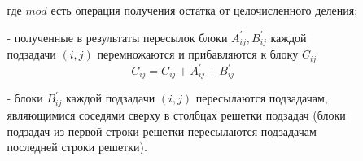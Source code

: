 \documentclass{report}
\begin{document}
\begin{enumerate}
\begin{itemize}
\begin{itemize}
$$                $$
                где {\itshape $mod$} есть операция получения остатка от целочисленного деления;
                \item[-] полученные в результаты пересылок блоки {\itshape $A_{ij}^{'}, B_{ij}^{'}$} каждой подзадачи {\itshape $(i,j)$} перемножаются и прибавляются к блоку {\itshape $C_{ij}$}
                $$
                {\mathit C_{ij} = C_{ij} + A_{ij}^{'} + B_{ij}^{'}}
                $$
                \item[-] блоки {\itshape $B_{ij}^{'}$} каждой подзадачи {\itshape $(i,j)$} пересылаются подзадачам, являющимися соседями сверху в столбцах решетки подзадач (блоки подзадач из первой строки решетки пересылаются подзадачам последней строки решетки).
            \end{itemize}
        \end{itemize}
\end{enumerate}

\newpage

\end{document}
